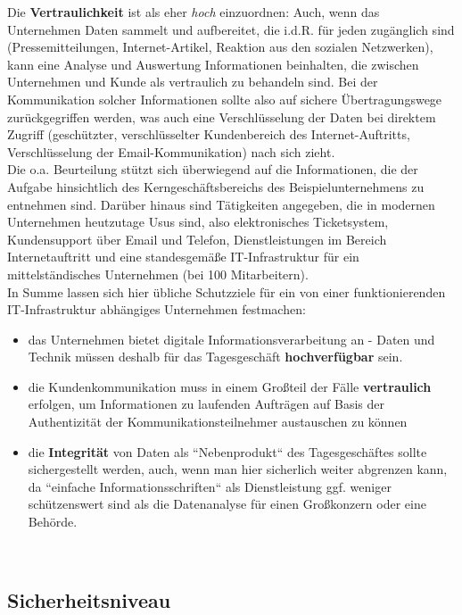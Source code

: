 Die \textbf{Vertraulichkeit} ist als eher \textit{hoch} einzuordnen: Auch, wenn das Unternehmen Daten sammelt und aufbereitet, die i.d.R. für jeden zugänglich sind (Pressemitteilungen, Internet-Artikel, Reaktion aus den sozialen Netzwerken), kann eine Analyse und Auswertung Informationen beinhalten, die zwischen Unternehmen und Kunde als vertraulich zu behandeln sind.
Bei der Kommunikation solcher Informationen sollte also auf sichere Übertragungswege zurückgegriffen werden, was auch eine Verschlüsselung der Daten bei direktem Zugriff (geschützter, verschlüsselter Kundenbereich des Internet-Auftritts, Verschlüsselung der Email-Kommunikation) nach sich zieht.\\


Die o.a. Beurteilung stützt sich überwiegend auf die Informationen, die der Aufgabe hinsichtlich des Kerngeschäftsbereichs des Beispielunternehmens zu entnehmen sind. Darüber hinaus sind Tätigkeiten angegeben, die in modernen Unternehmen heutzutage Usus sind, also elektronisches Ticketsystem, Kundensupport über Email und Telefon, Dienstleistungen im Bereich Internetauftritt und eine standesgemäße IT-Infrastruktur für ein mittelständisches Unternehmen (bei 100 Mitarbeitern).\\
In Summe lassen sich hier übliche Schutzziele für ein von einer funktionierenden IT-Infrastruktur abhängiges Unternehmen festmachen:
\begin{itemize}
    \itemsep0.5em
    \item das Unternehmen bietet digitale Informationsverarbeitung an - Daten und Technik müssen deshalb für das Tagesgeschäft \textbf{hochverfügbar} sein.
    \item die Kundenkommunikation muss in einem Großteil der Fälle \textbf{vertraulich} erfolgen, um Informationen zu laufenden Aufträgen auf Basis der Authentizität der Kommunikationsteilnehmer austauschen zu können
    \item die \textbf{Integrität} von Daten als ``Nebenprodukt`` des Tagesgeschäftes sollte sichergestellt werden, auch, wenn man hier sicherlich weiter abgrenzen kann, da ``einfache Informationsschriften`` als Dienstleistung ggf. weniger schützenswert sind als die Datenanalyse für einen Großkonzern oder eine Behörde.
\end{itemize}\\


\subsection*{Sicherheitsniveau}

